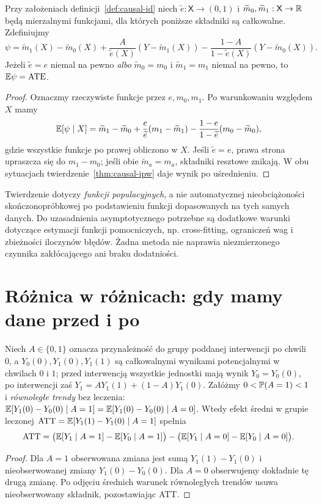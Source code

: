 \begin{twierdzenie}\label{thm:dr-id}
Przy założeniach definicji~\ref{def:causal-id} niech $\widetilde e:\mathsf X\to(0,1)$ i $\widetilde m_0,\widetilde m_1:\mathsf X\to\mathbb R$ będą mierzalnymi funkcjami, dla których poniższe składniki są całkowalne. Zdefiniujmy
\[
 \psi=\widetilde m_1(X)-\widetilde m_0(X)
 +\frac{A}{\widetilde e(X)}(Y-\widetilde m_1(X))
 -\frac{1-A}{1-\widetilde e(X)}(Y-\widetilde m_0(X)).
\]
Jeżeli $\widetilde e=e$ niemal na pewno \emph{albo} $\widetilde m_0=m_0$ i $\widetilde m_1=m_1$ niemal na pewno, to $\mathbb E\psi=\mathrm{ATE}$.
\end{twierdzenie}
\begin{proof}
Oznaczmy rzeczywiste funkcje przez $e,m_0,m_1$. Po warunkowaniu względem $X$ mamy
\[
 \mathbb E[\psi\mid X]=\widetilde m_1-\widetilde m_0
 +\frac e{\widetilde e}(m_1-\widetilde m_1)
 -\frac{1-e}{1-\widetilde e}(m_0-\widetilde m_0),
\]
gdzie wszystkie funkcje po prawej obliczono w $X$. Jeśli $\widetilde e=e$, prawa strona upraszcza się do $m_1-m_0$; jeśli obie $\widetilde m_a=m_a$, składniki resztowe znikają. W obu sytuacjach twierdzenie~\ref{thm:causal-ipw} daje wynik po uśrednieniu.
\end{proof}

\begin{uwaga}
Twierdzenie dotyczy \emph{funkcji populacyjnych}, a nie automatycznej nieobciążoności skończonopróbkowej po podstawieniu funkcji dopasowanych na tych samych danych. Do uzasadnienia asymptotycznego potrzebne są dodatkowe warunki dotyczące estymacji funkcji pomocniczych, np. cross-fitting, ograniczeń wag i zbieżności iloczynów błędów. Żadna metoda nie naprawia niezmierzonego czynnika zakłócającego ani braku dodatniości.
\end{uwaga}

\section{Różnica w różnicach: gdy mamy dane przed i po}
\begin{twierdzenie}\label{thm:did-att}
Niech $A\in\{0,1\}$ oznacza przynależność do grupy poddanej interwencji po chwili $0$, a $Y_0(0),Y_1(0),Y_1(1)$ są całkowalnymi wynikami potencjalnymi w chwilach $0$ i $1$; przed interwencją wszystkie jednostki mają wynik $Y_0=Y_0(0)$, po interwencji zaś $Y_1=A Y_1(1)+(1-A)Y_1(0)$. Załóżmy $0<\mathbb P(A=1)<1$ i \emph{równoległe trendy} bez leczenia:
$\mathbb E[Y_1(0)-Y_0(0)\mid A=1]=\mathbb E[Y_1(0)-Y_0(0)\mid A=0]$.
Wtedy efekt średni w grupie leczonej $\mathrm{ATT}=\mathbb E[Y_1(1)-Y_1(0)\mid A=1]$ spełnia
\[
\mathrm{ATT}=\big(\mathbb E[Y_1\mid A=1]-\mathbb E[Y_0\mid A=1]\big)
 -\big(\mathbb E[Y_1\mid A=0]-\mathbb E[Y_0\mid A=0]\big).
\]
\end{twierdzenie}
\begin{proof}
Dla $A=1$ obserwowana zmiana jest sumą $Y_1(1)-Y_1(0)$ i nieobserwowanej zmiany $Y_1(0)-Y_0(0)$. Dla $A=0$ obserwujemy dokładnie tę drugą zmianę. Po odjęciu średnich warunek równoległych trendów usuwa nieobserwowany składnik, pozostawiając ATT.
\end{proof}

